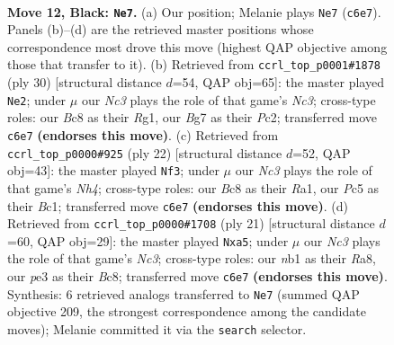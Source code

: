 \documentclass[11pt]{article}
\begin{document}
\clearpage

\begin{figure}[p]\centering
\begin{subfigure}{0.46\textwidth}\centering
\resizebox{\linewidth}{!}{%
\newchessgame
\chessboard[
  setfen={1rbq1rk1/ppn2pbp/2n3p1/2p1p3/7P/3PP1P1/PP3PB1/RNBQNRK1 b - - 2 12},
  showmover=false,
  pgfstyle=straightmove, color=movearrow, markmove={c6-e7}
]}
\caption{}
\end{subfigure}\hfill
\begin{subfigure}{0.46\textwidth}\centering
\resizebox{\linewidth}{!}{%
\newchessgame
\chessboard[
  setfen={1rb1k2r/2qnbpp1/p2pp2p/1p6/4P1P1/2N2P2/PPPQ1B1P/1K1R1BR1 w k - 5 16},
  showmover=false,
  pgfstyle=straightmove, color=movearrow, markmove={c3-e2}
]}
\caption{}
\end{subfigure}
\\[4pt]
\begin{subfigure}{0.46\textwidth}\centering
\resizebox{\linewidth}{!}{%
\newchessgame
\chessboard[
  setfen={rnbqnrk1/pp3pbp/3p2p1/2pP4/2P4N/2N4P/PP2BPP1/R1BQ1RK1 w - - 1 12},
  showmover=false,
  pgfstyle=straightmove, color=movearrow, markmove={h4-f3}
]}
\caption{}
\end{subfigure}\hfill
\begin{subfigure}{0.46\textwidth}\centering
\resizebox{\linewidth}{!}{%
\newchessgame
\chessboard[
  setfen={r1bq1rk1/pp1nppbp/2np2p1/P2P4/2P5/5N2/1P2BPPP/RNBQ1RK1 b - - 0 11},
  showmover=false,
  pgfstyle=straightmove, color=movearrow, markmove={c6-a5}
]}
\caption{}
\end{subfigure}
\caption{\textbf{Move 12, Black: \texttt{Ne7}.} (a) Our position; Melanie plays \texttt{Ne7} (\texttt{c6e7}). Panels (b)--(d) are the retrieved master positions whose correspondence most drove this move (highest QAP objective among those that transfer to it). (b) Retrieved from \texttt{ccrl\_top\_p0001\#1878} (ply 30) [structural distance $d$=54, QAP obj=65]: the master played \texttt{Ne2}; under $\mu$ our \emph{Nc3} plays the role of that game's \emph{Nc3}; cross-type roles: our \emph{B}c8 as their \emph{R}g1, our \emph{B}g7 as their \emph{P}c2; transferred move \texttt{c6e7} \textbf{(endorses this move)}. (c) Retrieved from \texttt{ccrl\_top\_p0000\#925} (ply 22) [structural distance $d$=52, QAP obj=43]: the master played \texttt{Nf3}; under $\mu$ our \emph{Nc3} plays the role of that game's \emph{Nh4}; cross-type roles: our \emph{B}c8 as their \emph{R}a1, our \emph{P}c5 as their \emph{B}c1; transferred move \texttt{c6e7} \textbf{(endorses this move)}. (d) Retrieved from \texttt{ccrl\_top\_p0000\#1708} (ply 21) [structural distance $d$=60, QAP obj=29]: the master played \texttt{Nxa5}; under $\mu$ our \emph{Nc3} plays the role of that game's \emph{Nc3}; cross-type roles: our \emph{n}b1 as their \emph{R}a8, our \emph{p}e3 as their \emph{B}c8; transferred move \texttt{c6e7} \textbf{(endorses this move)}. Synthesis: 6 retrieved analogs transferred to \texttt{Ne7} (summed QAP objective 209, the strongest correspondence among the candidate moves); Melanie committed it via the \texttt{search} selector.}
\label{fig:thought-m23}
\end{figure}
\end{document}
